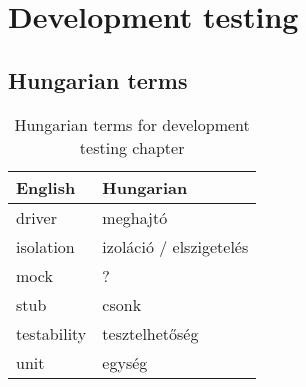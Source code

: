 \chapter{Development testing}




\section{Hungarian terms}

\begin{table}[ht]
    \centering
    \small
    \caption{Hungarian terms for development testing chapter}
    \begin{tabular}{ll}
        \toprule
        \textbf{English} & \textbf{Hungarian} \\
        \midrule
        driver & meghajtó \\
        isolation & izoláció / elszigetelés \\
        mock & ? \\
        stub & csonk \\
        testability & tesztelhetőség \\
        unit & egység \\
        \bottomrule
    \end{tabular}
    \label{tab:overview:hungarian-terms-developer-testing}
\end{table} 